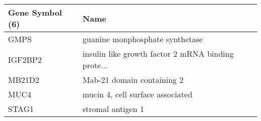 \begin{tabular}{ll}
\toprule
Gene Symbol (6) &                                               Name \\
\midrule
           GMPS &                    guanine monphosphate synthetase \\
        IGF2BP2 & insulin like growth factor 2 mRNA binding prote... \\
         MB21D2 &                         Mab-21 domain containing 2 \\
           MUC4 &                   mucin 4, cell surface associated \\
          STAG1 &                                  stromal antigen 1 \\
\bottomrule
\end{tabular}
